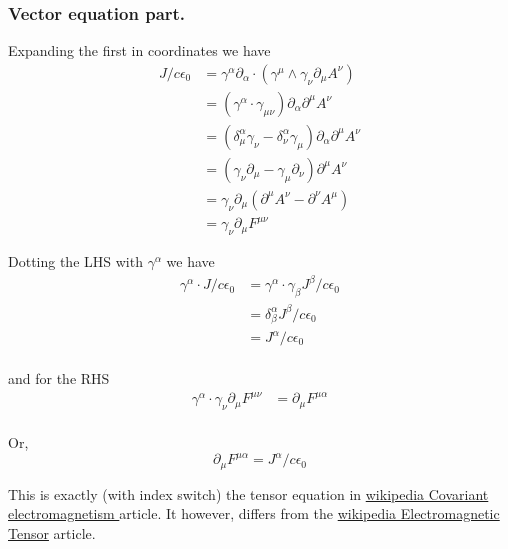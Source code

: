 \documentclass{article}
\begin{document}
\subsubsection{ Vector equation part. } 

Expanding the first in coordinates we have
\begin{align*}
J/c \epsilon_0 
&= \gamma^{\alpha} \partial_{\alpha} \cdot ( \gamma^{\mu} \wedge \gamma_{\nu} \partial_{\mu} A^{\nu} ) \\
&= (\gamma^{\alpha} \cdot \gamma_{\mu\nu}) \partial_{\alpha} \partial^{\mu} A^{\nu} \\
&= (
\delta^{\alpha}_{\mu} \gamma_{\nu}
-\delta^{\alpha}_{\nu} \gamma_{\mu}
) \partial_{\alpha} \partial^{\mu} A^{\nu} \\
&= ( \gamma_{\nu} \partial_{\mu} - \gamma_{\mu} \partial_{\nu} ) \partial^{\mu} A^{\nu} \\
&= \gamma_{\nu} \partial_{\mu} (\partial^{\mu} A^{\nu} -\partial^{\nu} A^{\mu} ) \\
&= \gamma_{\nu} \partial_{\mu} F^{\mu\nu}
\end{align*}

Dotting the LHS with $\gamma^{\alpha}$ we have
\begin{align*}
\gamma^{\alpha} \cdot J/c \epsilon_0 
&= \gamma^{\alpha} \cdot \gamma_{\beta }J^{\beta}/c \epsilon_0 \\
&= \delta^{\alpha}_{\beta }J^{\beta}/c \epsilon_0 \\
&= J^{\alpha}/c \epsilon_0 \\
\end{align*}

and for the RHS 
\begin{align*}
\gamma^{\alpha} \cdot \gamma_{\nu} \partial_{\mu} F^{\mu\nu}
&= \partial_{\mu} F^{\mu\alpha} \\
\end{align*}

Or,
\begin{equation}
\partial_{\mu} F^{\mu\alpha} = J^{\alpha}/c \epsilon_0
\end{equation}

This is exactly (with index switch) the tensor equation in 
\href{http://en.wikipedia.org/wiki/Covariant\_formulation\_of\_classical\_electromagnetism}{ wikipedia Covariant electromagnetism } article.
It however, differs from the 
\href{http://en.wikipedia.org/wiki/Electromagnetic_tensor}{wikipedia Electromagnetic Tensor} article.
\end{document}
